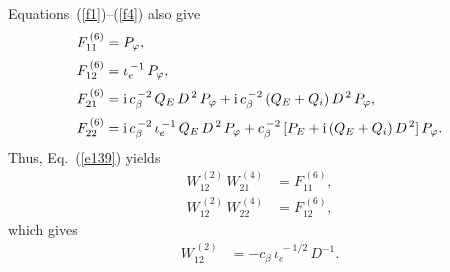 \documentclass[12pt,prb,aps]{revtex4-1}
\providecommand{\DIFadd}[1]{{\protect\color{blue}\uwave{#1}}} %
\providecommand{\DIFaddbegin}{} %
\providecommand{\DIFaddend}{} %
\begin{document}
Equations~(\ref{f1})--(\ref{f4}) also give 
\begin{align}
F^{\,(6)}_{11} &=P_\varphi,\\[0.5ex]
F^{\,(6)}_{12} &= \iota_e^{\,-1}\,P_\varphi,\\[0.5ex]
F^{\,(6)}_{21} &={\rm i}\,c_\beta^{\,-2}\,Q_E\,D^{\,2}\,P_\varphi + {\rm i}\,c_\beta^{\,-2}\,(Q_E+Q_i)\,D^{\,2}\,P_\varphi,\\[0.5ex]
F^{\,(6)}_{22} &={\rm i}\,c_\beta^{\,-2}\,\iota_e^{\,-1}\,Q_E\,D^{\,2}\,P_\varphi + c_\beta^{\,-2}\,[P_E+{\rm i}\,(Q_E+Q_i)\,D^{\,2}]\,P_\varphi.
\end{align}
Thus, Eq.~(\ref{e139}) yields\DIFaddbegin \DIFadd{, 
}\DIFaddend \begin{align}
W_{12}^{\,(2)}\,W_{21}^{\,(4)} &= F_{11}^{\,(6)},\\[0.5ex]
W_{12}^{\,(2)}\,W_{22}^{\,(4)} &= F_{12}^{\,(6)},
\end{align}
which gives 
\begin{align}
W_{12}^{\,(2)} &= - c_\beta\,\iota_e^{\,-1/2}\,D^{-1}.
\end{align}
\end{document}
